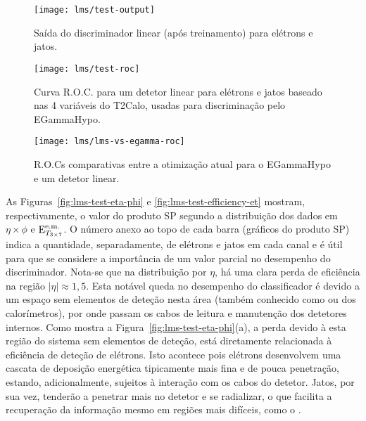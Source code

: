 \begin{figure}
\begin{center}
\texttt{[image: lms/test-output]}
\end{center}
\caption{Saída do discriminador linear (após treinamento) para elétrons e
jatos.}
\label{fig:lms-test-output}
\end{figure}

\begin{figure}
\begin{center}
\texttt{[image: lms/test-roc]}
\end{center}
\caption{Curva R.O.C. para um detetor linear para elétrons e jatos baseado nas
4 variáveis do T2Calo, usadas para discriminação pelo EGammaHypo.}
\label{fig:lms-test-roc}
\end{figure}

\begin{figure}
\begin{center}
\texttt{[image: lms/lms-vs-egamma-roc]}
\end{center}
\caption{R.O.Cs comparativas entre a otimização atual para o EGammaHypo e um
detetor linear.}
\label{fig:lms-vs-egamma-roc}
\end{figure}

As Figuras~\ref{fig:lms-test-eta-phi} e \ref{fig:lms-test-efficiency-et}
mostram, respectivamente, o valor do produto SP segundo a distribuição dos
dados em $\eta\times\phi$ e $\text{E}^{\text{e.m.}}_{T_{3\times7}}$. O número anexo ao topo de cada barra
(gráficos do produto SP) indica a quantidade, separadamente, de elétrons e
jatos em cada canal e é útil para que se considere a importância de um valor
parcial no desempenho do discriminador. Nota-se que na distribuição por
$\eta$, há uma clara perda de eficiência na região $|\eta| \approx 1,5$. Esta
notável queda no desempenho do classificador é devido a um espaço sem
elementos de deteção nesta área (também conhecido como  ou
 dos calorímetros), por onde passam os cabos de leitura e
manutenção dos detetores internos. Como mostra a
Figura~\ref{fig:lms-test-eta-phi}(a), a perda devido à esta região do sistema
sem elementos de deteção, está diretamente relacionada à eficiência de deteção
de elétrons. Isto acontece pois elétrons desenvolvem uma cascata de deposição
energética tipicamente mais fina e de pouca penetração, estando,
adicionalmente, sujeitos à interação com os cabos do detetor. Jatos, por sua
vez, tenderão a penetrar mais no detetor e se radializar, o que facilita a
recuperação da informação mesmo em regiões mais difíceis, como o
.

